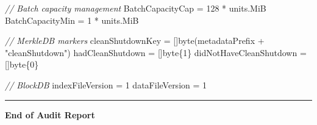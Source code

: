 \documentclass[
]{article}
\newenvironment{Shaded}{}{}
\newcommand{\CommentTok}[1]{\textcolor[rgb]{0.38,0.63,0.69}{\textit{#1}}}
\newcommand{\DataTypeTok}[1]{\textcolor[rgb]{0.56,0.13,0.00}{#1}}
\newcommand{\DecValTok}[1]{\textcolor[rgb]{0.25,0.63,0.44}{#1}}
\newcommand{\NormalTok}[1]{#1}
\newcommand{\OperatorTok}[1]{\textcolor[rgb]{0.40,0.40,0.40}{#1}}
\newcommand{\StringTok}[1]{\textcolor[rgb]{0.25,0.44,0.63}{#1}}
\begin{document}
\begin{Shaded}
\begin{Highlighting}[]
\CommentTok{// Batch capacity management}
\NormalTok{BatchCapacityCap }\OperatorTok{=} \DecValTok{128} \OperatorTok{*}\NormalTok{ units}\OperatorTok{.}\NormalTok{MiB}
\NormalTok{BatchCapacityMin }\OperatorTok{=} \DecValTok{1} \OperatorTok{*}\NormalTok{ units}\OperatorTok{.}\NormalTok{MiB}

\CommentTok{// MerkleDB markers}
\NormalTok{cleanShutdownKey }\OperatorTok{=} \OperatorTok{[]}\DataTypeTok{byte}\OperatorTok{(}\NormalTok{metadataPrefix }\OperatorTok{+} \StringTok{"cleanShutdown"}\OperatorTok{)}
\NormalTok{hadCleanShutdown }\OperatorTok{=} \OperatorTok{[]}\DataTypeTok{byte}\OperatorTok{\{}\DecValTok{1}\OperatorTok{\}}
\NormalTok{didNotHaveCleanShutdown }\OperatorTok{=} \OperatorTok{[]}\DataTypeTok{byte}\OperatorTok{\{}\DecValTok{0}\OperatorTok{\}}

\CommentTok{// BlockDB}
\NormalTok{indexFileVersion }\OperatorTok{=} \DecValTok{1}
\NormalTok{dataFileVersion }\OperatorTok{=} \DecValTok{1}
\end{Highlighting}
\end{Shaded}

\begin{center}\rule{0.5\linewidth}{0.5pt}\end{center}

\textbf{End of Audit Report}
\end{document}
